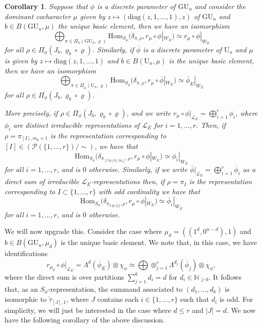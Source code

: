 \documentclass[reqno,11pt]{amsart}
\newtheorem{corollary}[theorem]{Corollary}
\theoremstyle{remark}
\newcommand{\GU}{\mathrm{GU}}
\newcommand{\U}{\mathrm{U}}
\newcommand{\mc}{\mathcal}
\newcommand{\diag}{\mathrm{diag}}
\newcommand{\ov}{\overline}
\newcommand{\ttau}{\tilde{\tau}}
\def\ol{\overline}
\begin{document}
\begin{corollary}{\label{stdmucor}}
Suppose that $\phi$ is a discrete parameter of $\GU_{n}$ and consider the dominant cocharacter $\mu$ given by $z \mapsto (\diag(z,1, \ldots, 1), z)$ of $\GU_{n}$ and $b \in B(\GU_n,\mu)$ the unique basic element, then we have an isomorphism
\[ \bigoplus_{\pi \in \Pi_{\phi}(\GU_n, \varrho)} \mathrm{Hom}_{S_{\phi}}(\delta_{\pi,\rho},r_{\mu} \circ \phi|_{\mc{W}_{E}}) \simeq  r_{\mu} \circ \phi|_{W_E} \]
for all $\rho \in \Pi_{\phi}(J_b, \varrho_{b} \circ \varrho)$. 
Similarly, if $\ov{\phi}$ is a discrete parameter of $\U_{n}$ and $\mu$ is given by $z \mapsto \diag(z,1, \ldots, 1)$ and $b \in B(\U_n,\mu)$ is the unique basic element, then we have an isomorphism
\[ \bigoplus_{\pi \in \Pi_{\ov{\phi}}(\U_n, \varrho)} \mathrm{Hom}_{S_{\ov{\phi}}}(\delta_{\pi,\rho},r_{\mu} \circ \ov{\phi}|_{W_{E}}) \simeq  \ov{\phi}_E|_{W_{E}} \]
for all $\rho \in \Pi_{\phi}(J_b, \varrho_{b}\circ \varrho)$.

More precisely, if $\rho \in \Pi_{\phi}(J_{b}, \varrho_{b} \circ \varrho)$, and we write $r_{\mu} \circ \phi|_{\mathcal{L}_{E}} = \bigoplus_{i = 1}^{r} \phi_{i}$, where $\phi_{i}$ are distinct irreducible representations of $\mathcal{L}_{E}$ for $i = 1,\ldots,r$. Then, if $\rho = \pi_{[I], m_0+1}$ is the representation corresponding to $[I] \in (\mc{P}(\{1, \dots, r\})/ \sim)$, we have that 
\[ \mathrm{Hom}_{S_{\phi}}(\delta_{\pi_{[I \oplus \{i\},m_0]},\rho},r_{\mu} \circ \phi|_{W_{E}}) \simeq \phi_{i}|_{W_{E}} \]
for all $i = 1,\ldots,r$, and is $0$ otherwise. Similarly, if we write $\ov{\phi}|_{\mathcal{L}_{E}} = \bigoplus_{i = 1}^{r} \ov{\phi}_{i}$ as a direct sum of irreducible $\mathcal{L}_{E}$-representations then, if $\rho = \pi_{I}$ is the representation corresponding to $I \subset \{1,\ldots,r\}$ with odd cardinality we have that
\[ \mathrm{Hom}_{S_{\phi}}(\delta_{\pi_{I \oplus \{i\}},\rho},r_{\mu} \circ \phi|_{W_{E}}) \simeq \ol{\phi}_{i}|_{W_{E}} \]
for all $i = 1,\ldots,r$, and is $0$ otherwise. 
\end{corollary} 
We will now upgrade this. Consider the case where $\mu_{d} = ((1^{d},0^{n - d}),1)$ and $b \in B(\GU_{n},\mu_{d})$ is the unique basic element. We note that, in this case, we have identifications
\[ r_{\mu_{d}} \circ \phi|_{\mc{L}_E} = \Lambda^{d}(\ov{\phi}_E)\otimes\chi_{\phi} \simeq \bigoplus  \otimes_{j = 1}^{r} \Lambda^{d_{j}}(\ov{\phi}_{j}) \otimes \chi_{\phi}, \]
where the direct sum is over partitions $\sum_{j = 1}^{k} d_{i} = d$ for $d_{i} \in \mathbb{N}_{\geq 0}$. It follows that, as an $S_{\phi}$-representation, the summand associated to $(d_1, \dots, d_k)$ is isomorphic to $\ttau_{[J],1}$, where $J$ contains each $i \in \{1, \dots, r\}$ such that $d_i$ is odd. For simplicity, we will just be interested in the case where $d \leq r$ and $|J|=d$. We now have the following corollary of the above discussion.
\end{document}
